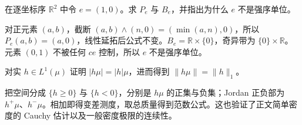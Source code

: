 \begin{exercise}[带的参考元不必为单位]\label{ex:y12-reference-band}
在逐坐标序 $\mathbb R^2$ 中令 $e=(1,0)$。求 $P_e$ 与 $B_e$，并指出为什么 $e$ 不是强序单位。
\end{exercise}
\begin{solution}
对正元素 $(a,b)$，截断 $(a,b)\wedge(n,0)=(\min(a,n),0)$，所以 $P_e(a,b)=(a,0)$，线性延拓后公式不变。$B_e=\mathbb R\times\{0\}$，奇异带为 $\{0\}\times\mathbb R$。元素 $(0,1)$ 不被任何 $ce$ 控制，所以 $e$ 不是强序单位。
\end{solution}

\begin{exercise}[密度的变差范数]\label{ex:y12-density-variation}
对实 $h\in L^1(\mu)$ 证明 $|h\mu|=|h|\mu$，进而得到 $\|h\mu\|=\|h\|_1$。
\end{exercise}
\begin{solution}
把空间分成 $\{h\ge0\}$ 与 $\{h<0\}$，分别是 $h\mu$ 的正集与负集；Jordan 正负部为 $h^+\mu$、$h^-\mu$。相加即得变差测度，取总质量得到范数公式。这也验证了正文简单密度的 Cauchy 估计以及一般密度极限的连续性。
\end{solution}
